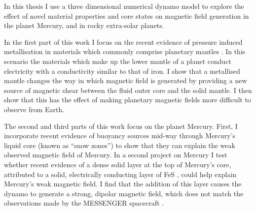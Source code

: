 In this thesis I use a three dimensional numerical dynamo model to explore the effect of novel material properties and core states on magnetic field generation in the planet Mercury, and in rocky extra-solar planets.

In the first part of this work I focus on the recent evidence of pressure induced metallisation in materials which commonly comprise planetary mantles \citep{nellis2010, tsuchiya2011, ohta2012}. In this scenario the materials which make up the lower mantle of a planet conduct electricity with a conductivity similar to that of iron. I show that a metallised mantle changes the way in which magnetic field is generated by providing a new source of magnetic shear between the fluid outer core and the solid mantle. I then show that this has the effect of making planetary magnetic fields more difficult to observe from Earth. 

The second and third parts of this work focus on the planet Mercury. First, I incorporate recent evidence \citep{chenetal2008} of buoyancy sources mid-way through Mercury's liquid core (known as ``snow zones'') to show that they can explain the weak observed magnetic field of Mercury. In a second project on Mercury I test whether recent evidence of a dense solid layer at the top of  Mercury's core, attributed to a solid, electrically conducting layer of FeS \citep{smith2012, hauck2013}, could help explain Mercury's weak magnetic field. I find that the addition of this layer causes the dynamo to generate a strong, dipolar magnetic field, which does not match the observations made by the MESSENGER spacecraft \citep{anderson2012}.